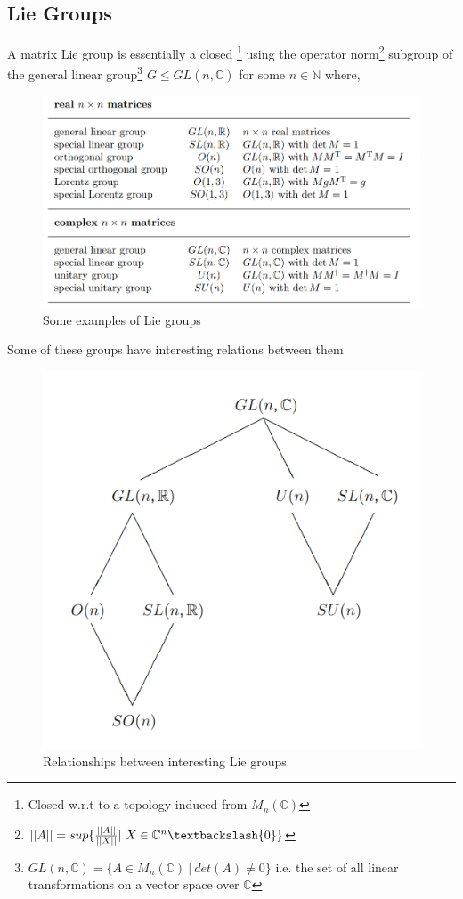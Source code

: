 \subsection{Lie Groups}
A matrix Lie group is essentially a closed \footnote{Closed w.r.t to a topology induced from $M_{n}(\mathbb{C})$} using the operator norm\footnote{$||A|| = sup \{ \frac{||A||}{||X||} | \ X \in \mathbb{C}^{n} \textbackslash \{0\} \}$} subgroup of the general linear group\footnote{$GL(n, \mathbb{C}) = \{ A \in M_{n}(\mathbb{C}) \ | \ det(A) \neq 0\}$ i.e. the set of all linear transformations on a vector space over $\mathbb{C}$ } $G \leq GL(n, \mathbb{C})$ for some $n \in \mathbb{N}$ where, 
\begin{figure}
	\centering
	\includegraphics[scale=0.5]{Figures/Lie-Groups.png}
	\caption{Some examples of Lie groups}
\end{figure}
Some of these groups have interesting relations between them
\begin{figure}
	\centering
	\includegraphics[scale=0.5]{Figures/cat-diag.png}
	\caption{Relationships between interesting Lie groups}
\end{figure}
